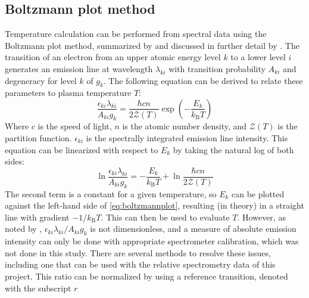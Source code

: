         \subsection{Boltzmann plot method}
            Temperature calculation can be performed from spectral data using the Boltzmann plot method, summarized by \textcite{ohnoValidityElectronTemperature2006} and discussed in further detail by \textcite{griemSpectroscopicTemperatureMeasurements1997}. The transition of an electron from an upper atomic energy level $k$ to a lower level $i$  generates an emission line at wavelength $\lambda_{ki}$ with transition probability $A_{ki}$ and degeneracy for level $k$ of $g_k$. The following equation can be derived to relate these parameters to plasma temperature $T$:
            \begin{equation} \label{eq:transition_energy}
                \frac{\epsilon_{ki}\lambda_{ki}}{A_{ki}g_k} = \frac{\hbar cn}{2 \mathcal{Z}(T)}\exp{\left(-\frac{E_k}{k_\mathrm{B}T}\right)}
            \end{equation}
            Where $c$ is the speed of light, $n$ is the atomic number density, and $\mathcal{Z}(T)$ is the partition function. $\epsilon_{ki}$ is the spectrally integrated emission line intensity. This equation can be linearized with respect to $E_k$ by taking the natural log of both sides:
            \begin{equation} \label{eq:boltzmannplot}
                \ln{\frac{\epsilon_{ki}\lambda_{ki}}{A_{ki}g_k}} = -\frac{E_k}{k_\mathrm{B}T} + \ln{\frac{\hbar cn}{2 \mathcal{Z}(T)}}
            \end{equation}
            The second term is a constant for a given temperature, so $E_k$ can be plotted against the left-hand side of \autoref{eq:boltzmannplot}, resulting (in theory) in a straight line with gradient $-1/k_\mathrm{B}T$. This can then be used to evaluate $T$. However, as noted by \textcite{volkerImportancePhysicalUnits2022}, $\epsilon_{ki}\lambda_{ki}/A_{ki}g_k$ is not dimensionless, and a measure of absolute emission intensity can only be done with appropriate spectrometer calibration, which was not done in this study. There are several methods to resolve these issues, including one that can be used with the relative spectrometry data of this project. This ratio can be normalized by using a reference transition, denoted with the subscript $r$

